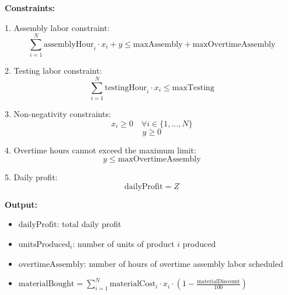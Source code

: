 \documentclass{article}
\begin{document}
\textbf{Constraints:}

1. Assembly labor constraint:
\[
\sum_{i=1}^{N} \text{assemblyHour}_i \cdot x_i + y \leq \text{maxAssembly} + \text{maxOvertimeAssembly}
\]

2. Testing labor constraint:
\[
\sum_{i=1}^{N} \text{testingHour}_i \cdot x_i \leq \text{maxTesting}
\]

3. Non-negativity constraints:
\[
x_i \geq 0 \quad \forall i \in \{1, \ldots, N\}
\]
\[
y \geq 0
\]

4. Overtime hours cannot exceed the maximum limit:
\[
y \leq \text{maxOvertimeAssembly}
\]

5. Daily profit:
\[
\text{dailyProfit} = Z
\]

\textbf{Output:}
\begin{itemize}
    \item \( \text{dailyProfit} \): total daily profit
    \item \( \text{unitsProduced}_i \): number of units of product \( i \) produced
    \item \( \text{overtimeAssembly} \): number of hours of overtime assembly labor scheduled
    \item \( \text{materialBought} = \sum_{i=1}^{N} \text{materialCost}_i \cdot x_i \cdot (1 - \frac{\text{materialDiscount}}{100}) \)
\end{itemize}
\end{document}
